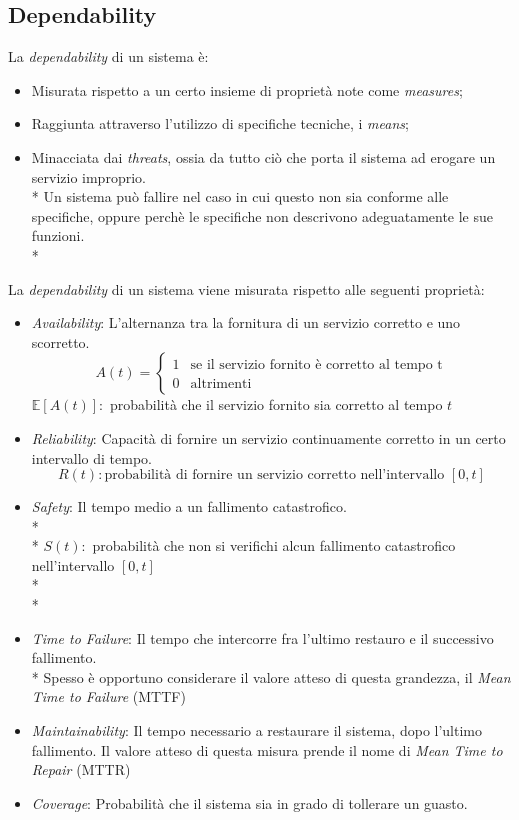 \subsection{Dependability}
La \emph{dependability} di un sistema \`e:
\begin{itemize}
	\item Misurata rispetto a un certo insieme di propriet\`a note come \emph{measures};
	\item Raggiunta attraverso l'utilizzo di specifiche tecniche, i \emph{means};
	\item Minacciata dai \emph{threats}, ossia da tutto ci\`o che porta il sistema ad erogare un servizio improprio.\\*
	Un sistema pu\`o fallire nel caso in cui questo non sia conforme alle specifiche, oppure perch\`e le specifiche non descrivono adeguatamente le sue funzioni.\\*
\end{itemize}
La \emph{dependability} di un sistema viene misurata rispetto alle seguenti propriet\`a:
\begin{itemize}
	\item \emph{Availability}: L'alternanza tra la fornitura di un servizio corretto e uno scorretto.
	$$
	A(t) = \begin{cases} 1 & \mbox{se il servizio fornito \`e corretto al tempo t} \\ 0 & \mbox{altrimenti} \end{cases}
	$$
	$\mathbb E[A(t)]:$ probabilit\`a che il servizio fornito sia corretto al tempo $t$
	\item \emph{Reliability}: Capacit\`a di fornire un servizio continuamente corretto in un certo intervallo di tempo.
	$$
	R(t):\mbox{probabilit\`a di fornire un servizio corretto nell'intervallo }[0,t]
	$$
	\item \emph{Safety}: Il tempo medio a un fallimento catastrofico.\\*\\*
	$S(t):$ probabilit\`a che non si verifichi alcun fallimento catastrofico nell'intervallo $[0,t]$\\*\\*
	\item \emph{Time to Failure}: Il tempo che intercorre fra l'ultimo restauro e il successivo fallimento.\\*
	Spesso \`e opportuno considerare il valore atteso di questa grandezza, il \emph{Mean Time to Failure} (MTTF)
	\item \emph{Maintainability}: Il tempo necessario a restaurare il sistema, dopo l'ultimo fallimento. Il valore atteso di questa misura prende il nome di \emph{Mean Time to Repair} (MTTR)
	\item \emph{Coverage}: Probabilit\`a che il sistema sia in grado di tollerare un guasto.
\end{itemize}
